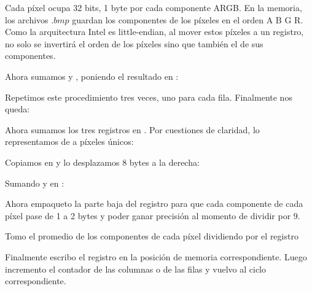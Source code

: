 Cada píxel ocupa 32 bits, 1 byte por cada componente ARGB. En la memoria, los archivos $.bmp$ guardan los componentes de los píxeles en el orden A B G R.
Como la arquitectura Intel es little-endian, al mover estos píxeles a un registro, no solo se invertirá el orden de los píxeles sino que también el de sus componentes.



Ahora sumamos  y , poniendo el resultado en :


Repetimos este procedimiento tres veces, uno para cada fila. Finalmente nos queda:




Ahora sumamos los tres registros en . Por cuestiones de claridad, lo representamos de a píxeles únicos:


Copiamos  en  y lo desplazamos 8 bytes a la derecha:


Sumando  y  en :


Ahora empaqueto la parte baja del registro para que cada componente de cada píxel pase de 1 a 2 bytes y poder ganar precisión al momento de dividir por 9.


Tomo el promedio de los componentes de cada píxel dividiendo por el registro 



Finalmente escribo el registro en la posición de memoria correspondiente. Luego incremento el contador de las columnas o de las filas y vuelvo al ciclo correspondiente.

